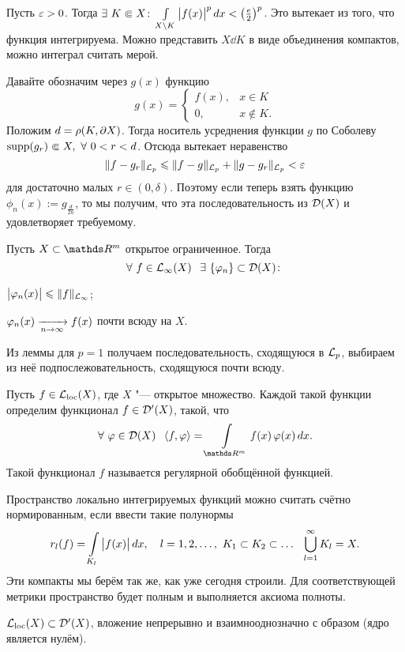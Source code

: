 \begin{Proof}
	Пусть $\varepsilon>0$. Тогда $\exists\ K\Subset X\colon \int\limits_{X\setminus K}\big|f(x)\big|^p\,dx<\left(\frac e2\right)^p$. Это вытекает из того, что функция интегрируема. Можно представить $X\dd K$ в виде объединения компактов, можно интеграл считать мерой.

	Давайте обозначим через $g(x)$ функцию
	\[
  g(x) = \begin{cases}
	  f(x),&x\in K\\
	  0,&x\not\in K.
  \end{cases}
	\]
	Положим $d = \rho(K,\partial X)$. Тогда носитель усреднения функции $g$ по Соболеву $\supp(g_r)\Subset X,\ \forall\ 0<r<d$. Отсюда вытекает неравенство
	\[
  \|f-g_r\|_{\mathcal L_p}\leqslant \|f-g\|_{\mathcal L_p}+\|g-g_r\|_{\mathcal L_p}<\varepsilon
	\]
	для достаточно малых $r\in(0,\delta)$. Поэтому если теперь взять функцию $\phi_n(x) := g_{\frac d{2n}}$, то мы получим, что эта последовательность из $\mathcal D(X)$ и удовлетворяет требуемому.
\end{Proof}
\begin{Sl}
	Пусть $X\subset \R^m$ открытое ограниченное. Тогда
	\[
	\forall\ f\in \L_\infty(X)\pau \exists\ \{\phi_n\}\subset \D(X)\colon
	\]
	\begin{azItems}
	\item $\big|\varphi_n(x)\big|\leqslant \|f\|_{\mathcal L_\infty}$;
	\item $\varphi_n(x)\xrightarrow[n\rightarrow\infty]{} f(x)$ почти всюду на $X$.
	\end{azItems}
\end{Sl}
\begin{Proof}
	Из леммы для $p=1$ получаем последовательность, сходящуюся в $\mathcal L_p$, выбираем из неё подпослежовательность, сходящуюся почти всюду.
\end{Proof}
\begin{Def}
	Пусть $f\in\mathcal L_{\mathrm{loc}}(X)$, где $X$ "--- открытое множество. Каждой такой функции определим функционал $f\in\mathcal D'(X)$, такой, что
	\[
	  \forall\ \phi\in\D(X)\pau \la f,\phi\ra = \Gint{\R^m}f(x)\,\phi(x)\,dx.
	\]
	Такой функционал $f$ называется регулярной обобщённой функцией.
\end{Def}
Пространство локально интегрируемых функций можно считать счётно нормированным, если ввести такие полунормы
\[
  r_l(f) = \int\limits_{K_l}\big|f(x)\big|\,dx,\quad l=1,2,\dots,\ K_1\subset K_2\subset\dots\hskip .75em plus.1em minus.08em\relax \bigcup\limits_{l=1}^\infty K_l=X.
\]
Эти компакты мы берём так же, как уже сегодня строили. Для соответствующей метрики пространство будет полным и выполняется аксиома полноты.
\begin{The}[о вложении]
  $\mathcal L_{\mathrm{loc}}(X)\subset \mathcal D'(X)$, вложение непрерывно и взаимнооднозначно с образом (ядро является нулём).
\end{The}
